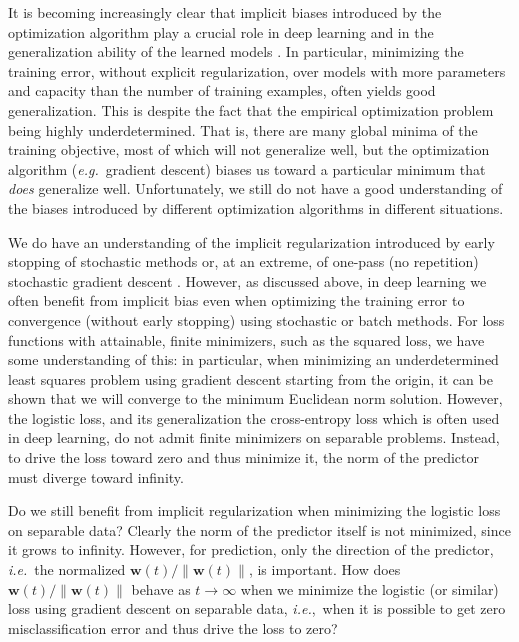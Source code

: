\documentclass[twoside,11pt,english]{article}
\newcommand{\norm}[1]{\left\lVert{#1}\right\rVert}
\begin{document}
It is becoming increasingly clear that implicit biases introduced
by the optimization algorithm play a crucial role in deep learning
and in the generalization ability of the learned models \citep{neyshabur2014search,neyshabur2015path,Zhang2016,Keskar2016,Neyshabur2017a,Wilson2017}.
In particular, minimizing the training error, without explicit
regularization, over models with more parameters and capacity
than the number of training examples, often yields good generalization. This is despite the fact that the empirical optimization problem being highly underdetermined.
That is, there are many global minima of the training objective, most
of which will not generalize well, but the optimization algorithm
(\emph{e.g.}~gradient descent) biases us toward a particular minimum
that {\em does} generalize well. Unfortunately, we still do not
have a good understanding of the biases introduced by different optimization
algorithms in different situations.

We do have an understanding of the implicit regularization introduced
by early stopping of stochastic methods or, at an extreme, of one-pass
(no repetition) stochastic gradient descent \citep{Hardt2015a}. However, as discussed above,
in deep learning we often benefit from implicit bias even when optimizing
the training error to convergence (without early stopping) using stochastic
or batch methods. For loss functions with attainable, finite minimizers,
such as the squared loss, we have some understanding of this: in particular,
when minimizing an underdetermined least squares problem using gradient
descent starting from the origin, it can be shown that we will converge to the
minimum Euclidean norm solution. However, the logistic loss, and its generalization
the cross-entropy loss which is often used in deep learning, do not
admit finite minimizers on separable problems. Instead, to drive
the loss toward zero and thus minimize it, the norm of the predictor must diverge
toward infinity.

Do we still benefit from implicit regularization when minimizing the
logistic loss on separable data? Clearly the norm of the predictor
itself is not minimized, since it grows to infinity. However, for
prediction, only the direction of the predictor, \emph{i.e.}~the
normalized $\mathbf{w}(t)/\norm{\mathbf{w}(t)}$, is important. How
does $\mathbf{w}(t)/\norm{\mathbf{w}(t)}$ behave as $t\rightarrow\infty$
when we minimize the logistic (or similar) loss using gradient descent
on separable data, \emph{i.e.},~when it is possible to get zero misclassification
error and thus drive the loss to zero?
\end{document}
